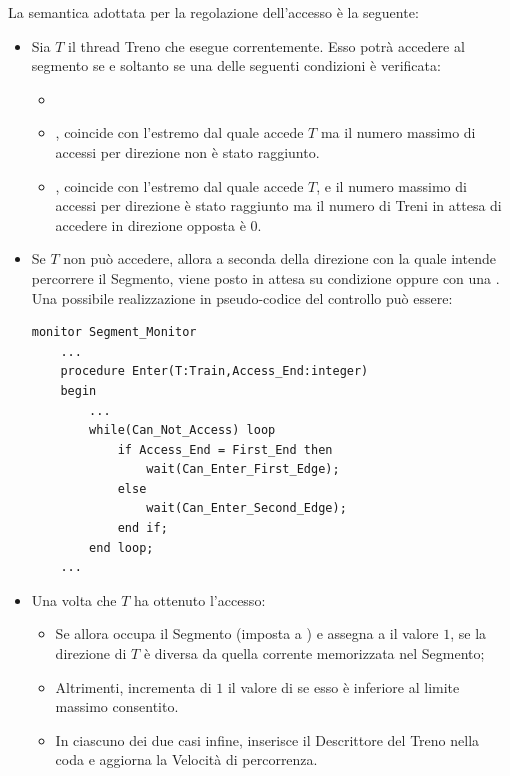 \begin{description}
		La semantica adottata per la regolazione dell'accesso è la seguente:
		\begin{itemize}
			\item Sia $T$ il thread Treno che esegue correntemente. Esso potrà accedere al segmento se e soltanto se una delle seguenti condizioni è verificata:
				\begin{itemize}
					\item {}
					\item {},  coincide con l'estremo dal quale accede $T$ ma il numero massimo di accessi per direzione non è stato raggiunto.
					\item {},  coincide con l'estremo dal quale accede $T$, e il numero massimo di accessi per direzione è stato raggiunto ma il numero di Treni in attesa di accedere in direzione opposta è 0.
				\end{itemize}
			\item Se $T$ non può accedere, allora a seconda della direzione con la quale intende percorrere il Segmento, viene posto in attesa su condizione  oppure  con una . Una possibile realizzazione in pseudo-codice del controllo può essere:
\begin{lstlisting}
monitor Segment_Monitor
	...
	procedure Enter(T:Train,Access_End:integer) 
	begin
		...
		while(Can_Not_Access) loop
			if Access_End = First_End then
				wait(Can_Enter_First_Edge);
			else
				wait(Can_Enter_Second_Edge);
			end if;
		end loop;
	...
\end{lstlisting}
			\item Una volta che $T$ ha ottenuto l'accesso:
				\begin{itemize}
					\item Se  allora occupa il Segmento (imposta  a ) e assegna a  il valore $1$, se la direzione di $T$ è diversa da quella corrente memorizzata nel Segmento;
					\item Altrimenti, incrementa di $1$ il valore di  se esso è inferiore al limite massimo consentito.
					\item In ciascuno dei due casi infine, inserisce il Descrittore del Treno nella coda  e aggiorna la Velocità di percorrenza.
				\end{itemize}
		\end{itemize}
			

\end{description}
